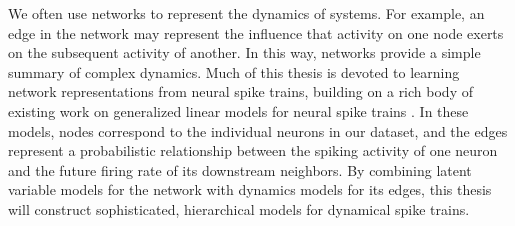 We often use networks to represent the dynamics of systems.  For
example, an edge in the network may represent the influence that
activity on one node exerts on the subsequent activity of another. In
this way, networks provide a simple summary of complex dynamics. Much
of this thesis is devoted to learning network representations from
neural spike trains, building on a rich body of existing work on
generalized linear models for neural spike trains
\citep{Paninski-2004, Truccolo-2005, Pillow-2008}.  In these models,
nodes correspond to the individual neurons in our dataset, and the
edges represent a probabilistic relationship between the spiking
activity of one neuron and the future firing rate of its downstream
neighbors.  By combining latent variable models for the network with
dynamics models for its edges, this thesis will construct
sophisticated, hierarchical models for dynamical spike trains.





